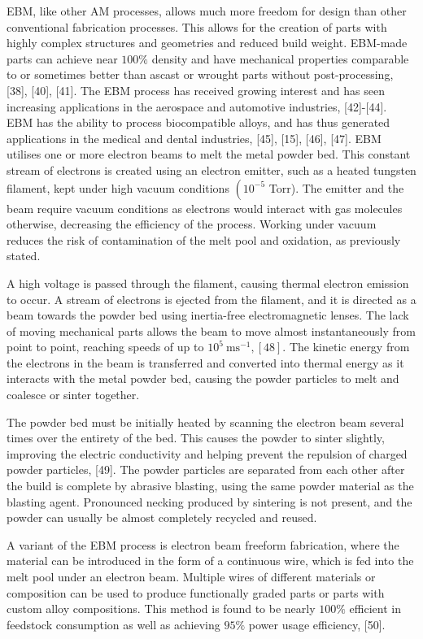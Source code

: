 \documentclass[10pt]{article}
\begin{document}
EBM, like other AM processes, allows much more freedom for design than other conventional fabrication processes. This allows for the creation of parts with highly complex structures and geometries and reduced build weight. EBM-made parts can achieve near $100 \%$ density and have mechanical properties comparable to or sometimes better than ascast or wrought parts without post-processing, [38], [40], [41]. The EBM process has received growing interest and has seen increasing applications in the aerospace and automotive industries, [42]-[44]. EBM has the ability to process biocompatible alloys, and has thus generated applications in the medical and dental industries, [45], [15], [46], [47]. EBM utilises one or more electron beams to melt the metal powder bed. This constant stream of electrons is created using an electron emitter, such as a heated tungsten filament, kept under high vacuum conditions $\left(10^{-5}\right.$ Torr). The emitter and the beam require vacuum conditions as electrons would interact with gas molecules otherwise, decreasing the efficiency of the process. Working under vacuum reduces the risk of contamination of the melt pool and oxidation, as previously stated.

A high voltage is passed through the filament, causing thermal electron emission to occur. A stream of electrons is ejected from the filament, and it is directed as a beam towards the powder bed using inertia-free electromagnetic lenses. The lack of moving mechanical parts allows the beam to move almost instantaneously from point to point, reaching speeds of up to $10^{5} \mathrm{~ms}^{-1},[48]$. The kinetic energy from the electrons in the beam is transferred and converted into thermal energy as it interacts with the metal powder bed, causing the powder particles to melt and coalesce or sinter together.

The powder bed must be initially heated by scanning the electron beam several times over the entirety of the bed. This causes the powder to sinter slightly, improving the electric conductivity and helping prevent the repulsion of charged powder particles, [49]. The powder particles are separated from each other after the build is complete by abrasive blasting, using the same powder material as the blasting agent. Pronounced necking produced by sintering is not present, and the powder can usually be almost completely recycled and reused.

A variant of the EBM process is electron beam freeform fabrication, where the material can be introduced in the form of a continuous wire, which is fed into the melt pool under an electron beam. Multiple wires of different materials or composition can be used to produce functionally graded parts or parts with custom alloy compositions. This method is found to be nearly $100 \%$ efficient in feedstock consumption as well as achieving $95 \%$ power usage efficiency, [50].
\end{document}
